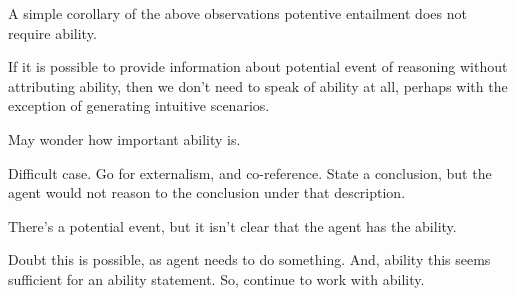 \begin{note}
  A simple corollary of the above observations potentive entailment does not require ability.

  If it is possible to provide information about potential event of reasoning without attributing ability, then we don't need to speak of ability at all, perhaps with the exception of generating intuitive scenarios.

  May wonder how important ability is.

  Difficult case.
  Go for externalism, and co-reference.
  State a conclusion, but the agent would not reason to the conclusion under that description.

  There's a potential event, but it isn't clear that the agent has the ability.

  Doubt this is possible, as agent needs to do something.
  And, ability this seems sufficient for an ability statement.
  So, continue to work with ability.
\end{note}

